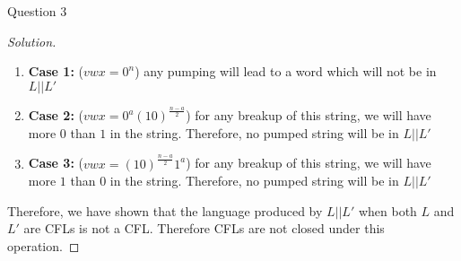 \begin{solution}{Question 3}
\begin{proof}[Solution]
      \begin{enumerate}
        \item \textbf{Case 1:} ($vwx = 0^n$) any pumping will lead to a word which will not be in $L || L'$
        \item \textbf{Case 2:} ($vwx = 0^a(10)^\frac{n - a}{2}$) for any breakup of this string, we will have more $0$ than $1$ in the string. Therefore, no pumped string will be in $L || L'$
        \item \textbf{Case 3:} ($vwx = (10)^\frac{n - a}{2}1^a$) for any breakup of this string, we will have more $1$ than $0$ in the string. Therefore, no pumped string will be in $L || L'$
      \end{enumerate}
      Therefore, we have shown that the language produced by $L || L'$ when both $L$ and $L'$ are CFLs is not a CFL. Therefore CFLs are not closed under this operation.
    \end{proof}
\end{solution}
